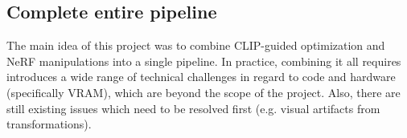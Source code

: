 \subsection{Complete entire pipeline}
The main idea of this project was to combine CLIP-guided optimization and NeRF manipulations into a single pipeline. In practice, combining it all requires introduces a wide range of technical challenges in regard to code and hardware (specifically VRAM), which are beyond the scope of the project. Also, there are still existing issues which need to be resolved first (e.g. visual artifacts from transformations).


